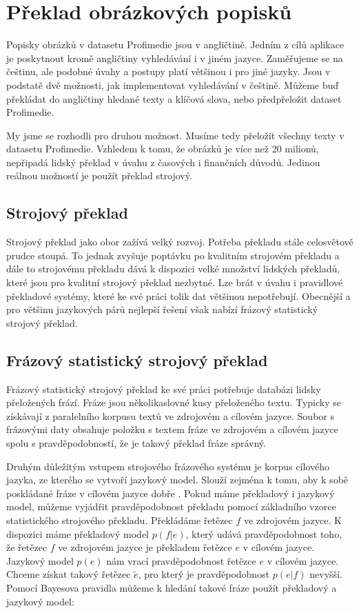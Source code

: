 \chapter{Překlad obrázkových popisků}

Popisky obrázků v datasetu Profimedie jsou v angličtině. Jedním z cílů aplikace je poskytnout kromě angličtiny vyhledávání i v jiném jazyce. Zaměřujeme se na češtinu, ale podobné úvahy a postupy platí většinou i pro jiné jazyky. Jsou v podstatě dvě možnosti, jak implementovat vyhledávání v češtině. Můžeme buď překládat do angličtiny hledané texty a klíčová slova, nebo předpřeložit dataset Profimedie.

My jsme se rozhodli pro druhou možnost. Musíme tedy přeložit všechny texty v datasetu Profimedie. Vzhledem k tomu, že obrázků je více než 20 milionů, nepřipadá lidský překlad v úvahu z časových i finančních důvodů. Jedinou reálnou možností je použít překlad strojový.

\section{Strojový překlad}

Strojový překlad jako obor zažívá velký rozvoj. Potřeba překladu stále celosvětově prudce stoupá. To jednak zvyšuje poptávku po kvalitním strojovém překladu a dále to strojovému překladu dává k dispozici velké množství lidských překladů, které jsou pro kvalitní strojový překlad nezbytné. Lze brát v úvahu i pravidlové překladové systémy, které ke své práci tolik dat většinou nepotřebují. Obecnější a pro většinu jazykových párů nejlepší řešení však nabízí frázový statistický strojový překlad.

\section{Frázový statistický strojový překlad}

 Frázový statistický strojový překlad\cite{koehn} ke své práci potřebuje databázi lidsky přeložených frází. Fráze jsou několikaslovné kusy přeloženého textu. Typicky se získávají z paralelního korpusu textů ve zdrojovém a cílovém jazyce. Soubor s frázovými daty obsahuje položku s textem fráze ve zdrojovém a cílovém jazyce spolu s pravděpodobností, že je takový překlad fráze správný.

Druhým důležitým vstupem strojového frázového systému je korpus cílového jazyka, ze kterého se vytvoří jazykový model. Slouží zejména k tomu, aby k sobě poskládané fráze v cílovém jazyce dobře . Pokud máme překladový i jazykový model, můžeme vyjádřit pravděpodobnost překladu pomocí základního vzorce statistického strojového překladu. Překládáme řetězec $f$ ve zdrojovém jazyce. K dispozici máme překladový model $p(f|e)$, který udává pravděpodobnost toho, že řetězec $f$ ve zdrojovém jazyce je překladem řetězce $e$ v cílovém jazyce. Jazykový model $p(e)$ nám vrací pravděpodobnost řetězce $e$ v cílovém jazyce. Chceme získat takový řetězec $\tilde{e}$, pro který je pravděpodobnost $p(e|f)$ nevyšší. Pomocí Bayesova pravidla můžeme k hledání takové fráze použít překladový a jazykový model:

